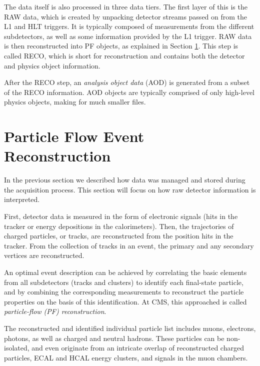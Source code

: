  The data itself is also processed in three data tiers. The first layer of this is the RAW data, which is created by unpacking detector streams passed on from the L1 and HLT triggers. It is typically composed of measurements from the different subdetectors, as well as some information provided by the L1 trigger. RAW data is then reconstructed into PF objects, as explained in Section \ref{sec:track}. This step is called RECO, which is short for reconstruction and contains both the detector and physics object information. 

 After the RECO step, an \textit{analysis object data} (AOD) is generated from a subset of the RECO information. AOD objects are typically comprised of only high-level physics objects, making for much smaller files. 



\section{Particle Flow Event Reconstruction}
\label{sec:track}

 In the previous section we described how data was managed and stored during the acquisition process. This section will focus on how raw detector information is interpreted.  

First, detector data is measured in the form of electronic signals (hits in the tracker or energy depositions in the calorimeters). Then, the trajectories of charged particles, or tracks, are reconstructed from the position hits in the tracker. From the collection of tracks in an event, the primary and any secondary vertices are reconstructed. 

An optimal event description can be achieved by correlating the basic elements from all subdetectors (tracks and clusters) to identify each final-state particle, and by combining the corresponding measurements to reconstruct the particle properties on the basis of this identification. At CMS, this approached is called \textit{particle-flow (PF) reconstruction}.

The reconstructed and identified individual particle list includes muons, electrons, photons, as well as charged  and neutral hadrons. These particles can be non-isolated, and even originate from an intricate overlap of reconstructed charged particles, ECAL and HCAL energy clusters, and signals in the muon chambers.

